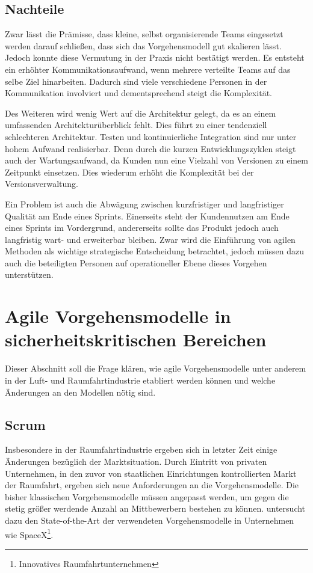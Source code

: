 \subsection{Nachteile} %

Zwar lässt die Prämisse, dass kleine, selbst organisierende Teams eingesetzt werden darauf schließen, dass sich das Vorgehensmodell gut skalieren lässt. 
Jedoch konnte diese Vermutung in der Praxis nicht bestätigt werden. 
Es entsteht ein erhöhter Kommunikationsaufwand, wenn mehrere verteilte Teams auf das selbe Ziel hinarbeiten.
Dadurch sind viele verschiedene Personen in der Kommunikation involviert und dementsprechend steigt die Komplexität.
\parencite[Vgl.][S. 1481]{Petersen20091479}

Des Weiteren wird wenig Wert auf die Architektur gelegt, da es an einem umfassenden Architekturüberblick fehlt. 
Dies führt zu einer tendenziell schlechteren Architektur.
Testen und kontinuierliche Integration sind nur unter hohem Aufwand realisierbar.
Denn durch die kurzen Entwicklungszyklen steigt auch der Wartungsaufwand, da Kunden nun eine Vielzahl von Versionen zu einem Zeitpunkt einsetzen.
Dies wiederum erhöht die Komplexität bei der Versionsverwaltung.
\parencite[Vgl.][S. 1486]{Petersen20091479}

Ein Problem ist auch die Abwägung zwischen kurzfristiger und langfristiger Qualität am Ende eines Sprints.
Einerseits steht der Kundennutzen am Ende eines Sprints im Vordergrund, andererseits sollte das Produkt jedoch auch langfristig wart- und erweiterbar bleiben.
Zwar wird die Einführung von agilen Methoden als wichtige strategische Entscheidung betrachtet, jedoch müssen dazu auch die beteiligten Personen auf operationeller Ebene dieses Vorgehen unterstützen.
\parencite[Vgl.][S. 863 f.]{Moe:2012aa}

\section{Agile Vorgehensmodelle in sicherheitskritischen Bereichen} %

Dieser Abschnitt soll die Frage klären, wie agile Vorgehensmodelle unter anderem in der Luft- und Raumfahrtindustrie etabliert werden können und welche Änderungen an den Modellen nötig sind.

\subsection{Scrum} 

Insbesondere in der Raumfahrtindustrie ergeben sich in letzter Zeit einige Änderungen bezüglich der Marktsituation.
Durch Eintritt von privaten Unternehmen, in den zuvor von staatlichen Einrichtungen kontrollierten Markt der Raumfahrt, ergeben sich neue Anforderungen an die Vorgehensmodelle.
Die bisher klassischen Vorgehensmodelle müssen angepasst werden, um gegen die stetig größer werdende Anzahl an Mittbewerbern bestehen zu können.
\parencite[][]{Carpenter:2014aa} untersucht dazu den State-of-the-Art der verwendeten Vorgehensmodelle in Unternehmen wie SpaceX\footnote{Innovatives Raumfahrtunternehmen}.

